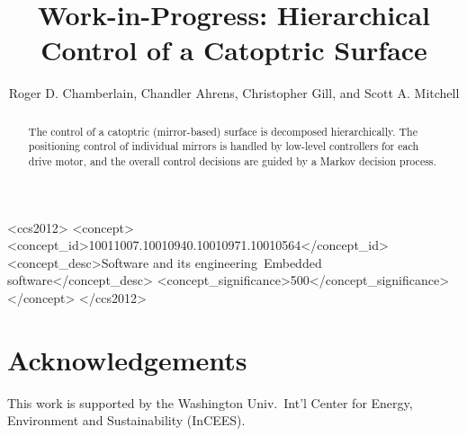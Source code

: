 \documentclass[sigconf]{acmart}
\begin{document}
\title{Work-in-Progress: Hierarchical Control of a Catoptric Surface}


\author{Roger D. Chamberlain, Chandler Ahrens, Christopher Gill, and Scott A. Mitchell}


\renewcommand{\shortauthors}{R. Chamberlain et al.}


\begin{abstract}
The control of a catoptric (mirror-based) surface is decomposed
hierarchically. The positioning control of individual mirrors
is handled by low-level controllers for each drive motor, and the
overall control decisions are guided by a Markov decision process.
\end{abstract}

%
%
\begin{CCSXML}
<ccs2012>
<concept>
<concept_id>10011007.10010940.10010971.10010564</concept_id>
<concept_desc>Software and its engineering~Embedded software</concept_desc>
<concept_significance>500</concept_significance>
</concept>
</ccs2012>
\end{CCSXML}





\maketitle






\section*{Acknowledgements}
This work is supported by the Washington Univ.~Int'l Center for
Energy, Environment and Sustainability (InCEES).



\end{document}
